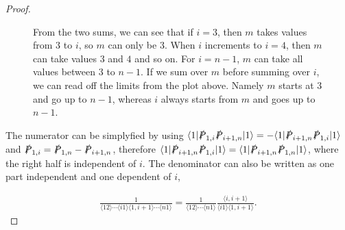 \documentclass{article}
\theoremstyle{definition}
\numberwithin{equation}{section}
\begin{document}
\begin{proof}
\begin{figure}[H]
\begin{center}
        \caption{From the two sums, we can see that if $i=3$, then $m$ takes values from $3$ to $i$, so $m$ can only be $3$. When $i$ increments to $i=4$, then $m$ can take values $3$ and $4$ and so on. For $i=n-1$, $m$ can take all values between $3$ to $n-1$. If we sum over $m$ before summing over $i$, we can read off the limits from the plot above. Namely $m$ starts at $3$ and go up to $n-1$, whereas $i$ always starts from $m$ and goes up to $n-1$.}
        \label{plt:sums}
        \end{center}
    \end{figure}

    The numerator can be simplyfied by using $\langle 1 | \slashed{P}_{1,i} \slashed{P}_{i+1,n} | 1 \rangle = - \langle 1 | \slashed{P}_{i+1,n} \slashed{P}_{1,i} | 1 \rangle$ and $\slashed{P}_{1,i} = \slashed{P}_{1,n} - \slashed{P}_{i+1,n}$, therefore $\langle 1 | \slashed{P}_{i+1,n} \slashed{P}_{1,i} | 1 \rangle = \langle 1 | \slashed{P}_{i+1,n} \slashed{P}_{1,n} | 1 \rangle$, where the right half is independent of $i$. The denominator can also be written as one part independent and one dependent of $i$,

    \begin{align*}
        \frac{ 1 }{ \langle 12 \rangle \cdots \langle i1 \rangle \langle 1,i+1 \rangle \cdots \langle n1 \rangle } = \frac{1}{ \langle 12 \rangle \cdots \langle n1 \rangle } \frac{ \langle i,i+1 \rangle }{ \langle i1 \rangle \langle 1,i+1 \rangle }.
    \end{align*}


\end{proof}
\end{document}
